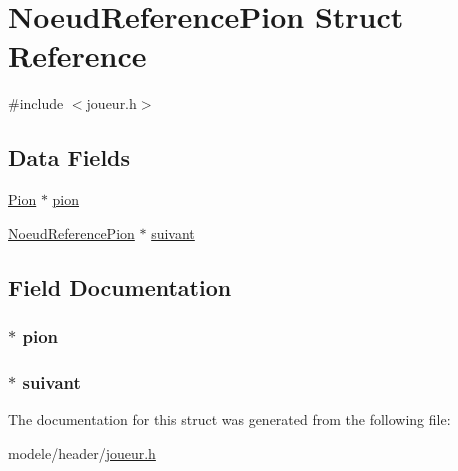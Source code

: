 \hypertarget{struct_noeud_reference_pion}{\section{Noeud\-Reference\-Pion Struct Reference}
\label{struct_noeud_reference_pion}
}


{\ttfamily \#include $<$joueur.\-h$>$}

\subsection*{Data Fields}
\begin{DoxyCompactItemize}
\item 
\hyperlink{struct_pion}{Pion} $\ast$ \hyperlink{struct_noeud_reference_pion_a0224d782f98071941365738119daa136}{pion}
\item 
\hyperlink{struct_noeud_reference_pion}{Noeud\-Reference\-Pion} $\ast$ \hyperlink{struct_noeud_reference_pion_ae88d71ac4562f90db8599bba2af7be3c}{suivant}
\end{DoxyCompactItemize}


\subsection{Field Documentation}
\hypertarget{struct_noeud_reference_pion_a0224d782f98071941365738119daa136}{
\subsubsection[{pion}]{$\ast$ pion}}\label{struct_noeud_reference_pion_a0224d782f98071941365738119daa136}
\hypertarget{struct_noeud_reference_pion_ae88d71ac4562f90db8599bba2af7be3c}{
\subsubsection[{suivant}]{$\ast$ suivant}}\label{struct_noeud_reference_pion_ae88d71ac4562f90db8599bba2af7be3c}


The documentation for this struct was generated from the following file\-:\begin{DoxyCompactItemize}
\item 
modele/header/\hyperlink{joueur_8h}{joueur.\-h}\end{DoxyCompactItemize}
